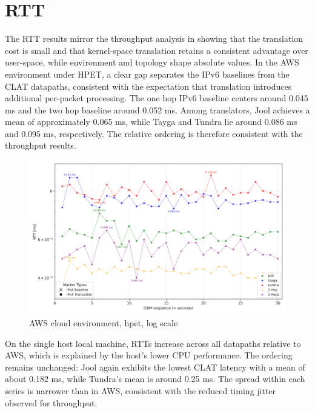 \section{RTT}
The RTT results mirror the throughput analysis in showing that the translation cost is small and that kernel-space translation retains a consistent advantage over user-space, while environment and topology shape absolute values. In the AWS environment under HPET, a clear gap separates the IPv6 baselines from the CLAT datapaths, consistent with the expectation that translation introduces additional per-packet processing. The one hop IPv6 baseline centers around 0.045 ms and the two hop baseline around 0.052 ms. Among translators, Jool achieves a mean of approximately 0.065 ms, while Tayga and Tundra lie around 0.086 ms and 0.095 ms, respectively. The relative ordering is therefore consistent with the throughput results. 


\begin{figure}[H]
    \centering
    \includegraphics[width=1\textwidth]{resources/plots/CombinedPlot/RTT/AWS_ping_rtt_Ping_30s_log.png}
    \caption{AWS cloud environment, hpet, log scale}
    \label{fig:AWS_icmp_sameScale_hpet_log}

\end{figure}

On the single host local machine, RTTs increase across all datapaths relative to AWS, which is explained by the host’s lower CPU performance. The ordering remains unchanged: Jool again exhibits the lowest CLAT latency with a mean of about 0.182 ms, while Tundra’s mean is around 0.25 ms. The spread within each series is narrower than in AWS, consistent with the reduced timing jitter observed for throughput. 

